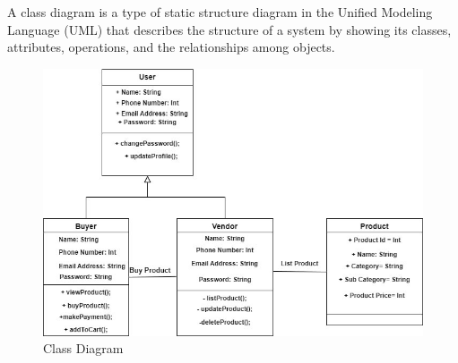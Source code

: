 \documentclass[12pt, a4paper, oneside]{article}
\begin{document}
A class diagram is a type of static structure diagram in the Unified Modeling Language (UML) that describes the structure of a system by showing its classes, attributes, operations, and the relationships among objects.
\begin{figure}[H]
\includegraphics[width=\linewidth]{class_diagram}
\centering
\caption{Class Diagram}
\label{fig:class_diagram}
\end{figure}

\pagebreak


\end{document}

